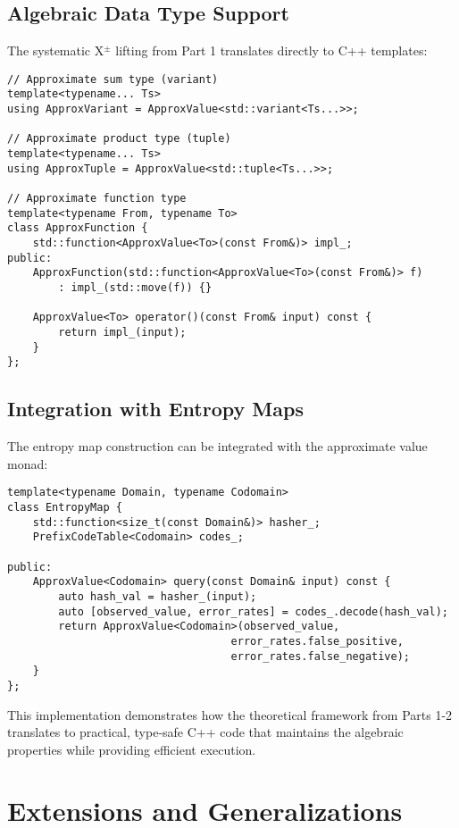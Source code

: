 \documentclass[11pt,final,hidelinks]{article}
\begin{document}
\subsection{Algebraic Data Type Support}

The systematic X$^{\pm}$ lifting from Part 1 translates directly to C++ templates:

\begin{verbatim}
// Approximate sum type (variant)
template<typename... Ts>
using ApproxVariant = ApproxValue<std::variant<Ts...>>;

// Approximate product type (tuple)  
template<typename... Ts>
using ApproxTuple = ApproxValue<std::tuple<Ts...>>;

// Approximate function type
template<typename From, typename To>
class ApproxFunction {
    std::function<ApproxValue<To>(const From&)> impl_;
public:
    ApproxFunction(std::function<ApproxValue<To>(const From&)> f)
        : impl_(std::move(f)) {}
        
    ApproxValue<To> operator()(const From& input) const {
        return impl_(input);
    }
};
\end{verbatim}

\subsection{Integration with Entropy Maps}

The entropy map construction can be integrated with the approximate value monad:

\begin{verbatim}
template<typename Domain, typename Codomain>
class EntropyMap {
    std::function<size_t(const Domain&)> hasher_;
    PrefixCodeTable<Codomain> codes_;
    
public:
    ApproxValue<Codomain> query(const Domain& input) const {
        auto hash_val = hasher_(input);
        auto [observed_value, error_rates] = codes_.decode(hash_val);
        return ApproxValue<Codomain>(observed_value, 
                                   error_rates.false_positive,
                                   error_rates.false_negative);
    }
};
\end{verbatim}

This implementation demonstrates how the theoretical framework from Parts 1-2 translates to practical, type-safe C++ code that maintains the algebraic properties while providing efficient execution.

\section{Extensions and Generalizations}
\end{document}
